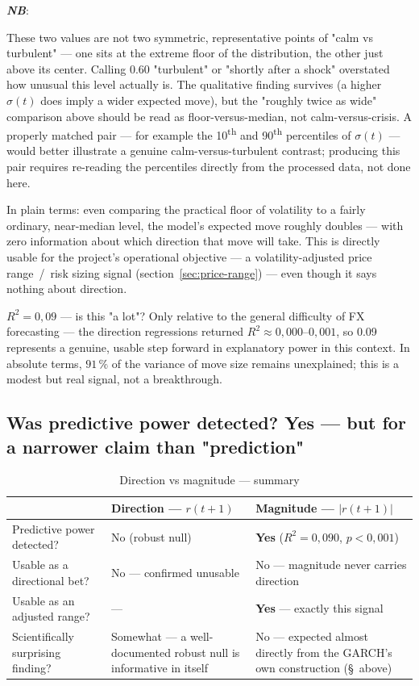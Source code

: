 \documentclass[12pt,a4paper]{article}
\begin{document}
\newpage	

\textbf{\textit{NB}}:


These two values are not two symmetric, representative points
of "calm vs turbulent" --- one sits at the extreme floor of the
distribution, the other just above its
center. Calling 0.60 "turbulent" or
"shortly after a shock" overstated how unusual this level
actually is. The qualitative finding survives (a higher
$\sigma(t)$ does imply a wider expected move), but the
"roughly twice as wide" comparison above should be read
as floor-versus-median, not calm-versus-crisis. A properly
matched pair --- for example the 10\textsuperscript{th}
and 90\textsuperscript{th} percentiles of $\sigma(t)$ --- would better
illustrate a genuine calm-versus-turbulent contrast; producing
this pair requires re-reading the percentiles directly from the
processed data, not done here.


In plain terms: even comparing the practical floor of volatility to a
fairly ordinary, near-median level, the model's expected move
roughly doubles --- with zero information about which direction
that move will take. This is directly usable for
the project's operational objective --- a volatility-adjusted
price range~/~risk sizing signal
(section~\ref{sec:price-range}) --- even though it says nothing about
direction.

\vspace{0.2cm}

$R^2=0{,}09$ --- is this "a lot"? Only relative to the
general difficulty of FX forecasting --- the direction
regressions returned $R^2 \approx 0{,}000$--$0{,}001$, so 0.09
represents a genuine, usable step forward in explanatory power
in this context. In absolute terms, $91\,\%$ of the variance of
move size remains unexplained; this is a modest but
real signal, not a breakthrough.

\subsection{Was predictive power detected? Yes --- but for a narrower claim than "prediction"}

\begin{table}[H]
	\centering
	\small
	\caption{Direction vs magnitude --- summary}
	\begin{tabular}{|p{4.7cm}|p{4.2cm}|p{4.2cm}|}
		\hline
		& Direction --- $r(t+1)$ & Magnitude --- $|r(t+1)|$ \\
		\hline
		Predictive power detected? & No (robust null) & \textbf{Yes} ($R^2=0{,}090$, $p<0{,}001$) \\
		\hline
		Usable as a directional bet? & No --- confirmed unusable & No --- magnitude never carries direction \\
		\hline
		Usable as an adjusted range? & --- & \textbf{Yes} --- exactly this signal \\
		\hline
		Scientifically surprising finding? & Somewhat --- a well-documented robust null is informative in itself & No --- expected almost directly from the GARCH's own construction (\S~above) \\
		\hline
	\end{tabular}
\end{table}
\end{document}
